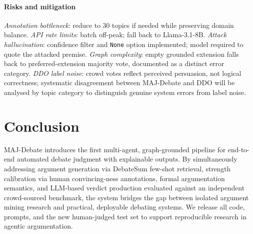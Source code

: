 \documentclass[11pt,twocolumn,letterpaper]{article}
\begin{document}
\paragraph{Risks and mitigation}
\textit{Annotation bottleneck}: reduce to 30 topics if needed while
preserving domain balance.
\textit{API rate limits}: batch off-peak; fall back to Llama-3.1-8B.
\textit{Attack hallucination}: confidence filter and \texttt{None} option
implemented; model required to quote the attacked premise.
\textit{Graph complexity}: empty grounded extension falls back to
preferred-extension majority vote, documented as a distinct error category.
\textit{DDO label noise}: crowd votes reflect perceived persuasion, not
logical correctness; systematic disagreement between MAJ-Debate and DDO
will be analysed by topic category to distinguish genuine system errors
from label noise.

\section{Conclusion}

MAJ-Debate introduces the first multi-agent, graph-grounded pipeline for
end-to-end automated debate judgment with explainable outputs. By
simultaneously addressing argument generation via DebateSum few-shot
retrieval, strength calibration via human convincing-ness annotations,
formal argumentation semantics, and LLM-based verdict production evaluated
against an independent crowd-sourced benchmark, the system bridges the gap
between isolated argument mining research and practical, deployable debating
systems. We release all code, prompts, and the new human-judged test set
to support reproducible research in agentic argumentation.



\end{document}
